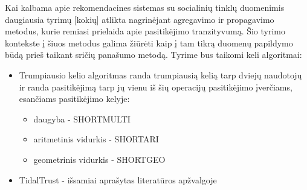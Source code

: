 \documentclass{VUMIFInfMagistrinis}
\begin{document}

\indent
Kai kalbama apie rekomendacines sistemas su socialinių tinklų duomenimis daugiausia tyrimų [kokių] atlikta nagrinėjant agregavimo ir propagavimo metodus, kurie remiasi prielaida apie pasitikėjimo tranzityvumą. Šio tyrimo kontekste į šiuos metodus galima žiūrėti kaip į tam tikrą duomenų papildymo būdą prieš taikant sričių panašumo metodą. 
\indent 
Tyrime bus taikomi keli algoritmai:
\begin{itemize}
	\item Trumpiausio kelio algoritmas randa trumpiausią kelią tarp dviejų naudotojų ir randa pasitikėjimą tarp jų vienu iš šių operacijų pasitikėjimo įverčiams, esančiams pasitikėjimo kelyje:
	\begin{itemize}
		\item daugyba - SHORTMULTI
		\item aritmetinis vidurkis - SHORTARI
		\item geometrinis vidurkis - SHORTGEO
	\end{itemize}
	\item TidalTrust - išsamiai aprašytas literatūros apžvalgoje
\end{itemize}
\end{document}
